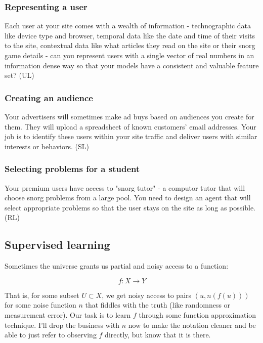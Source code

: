 \documentclass{article}
\begin{document}
\subsubsection{Representing a user}

Each user at your site comes with a wealth of information - technographic data like device type and browser, temporal data like the date and time of their visits to the site, contextual data like what articles they read on the site or their snorg game details - can you represent users with a single vector of real numbers in an information dense way so that your models have a consistent and valuable feature set? (UL)

\subsubsection{Creating an audience}

Your advertisers will sometimes make ad buys based on audiences you create for them. They will upload a spreadsheet of known customers' email addresses. Your job is to identify these users within your site traffic and deliver users with similar interests or behaviors. (SL)

\subsubsection{Selecting problems for a student}

Your premium users have access to "snorg tutor" - a computor tutor that will choose snorg problems from a large pool. You need to design an agent that will select appropriate problems so that the user stays on the site as long as possible. (RL)

\subsection{Supervised learning}

Sometimes the universe grants us partial and noisy access to a function:

$$f: X \to Y$$

That is, for some subset $U \subset X$, we get noisy access to pairs $(u, n(f(u)))$ for some noise function $n$ that fiddles with the truth (like randomness or measurement error). Our task is to learn $f$ through some function approximation technique. I'll drop the business with $n$ now to make the notation cleaner and be able to just refer to observing $f$ directly, but know that it is there.
\end{document}

